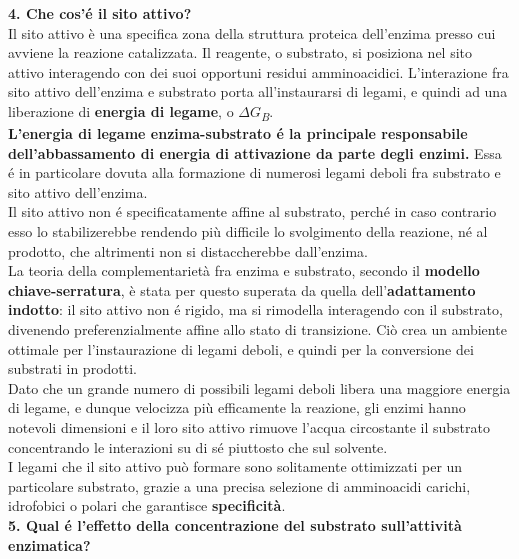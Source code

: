 \documentclass[a4paper,12pt]{article}
\begin{document}
\textbf{4. Che cos'\'e il sito attivo?}\\

Il sito attivo \`e una specifica zona della struttura proteica dell'enzima presso cui avviene la reazione catalizzata. Il reagente, o substrato, si posiziona nel sito attivo interagendo con dei suoi opportuni residui amminoacidici.
L'interazione fra sito attivo dell'enzima e substrato porta all'instaurarsi di legami, e quindi ad una liberazione di \textbf{energia di legame}, o \textit{$\Delta G$\textsubscript{B}}.\\
\textbf{L'energia di legame enzima-substrato \'e la principale responsabile dell'abbassamento di energia di attivazione da parte degli enzimi.}
Essa \'e in particolare dovuta alla formazione di numerosi legami deboli fra substrato e sito attivo dell'enzima.\\
Il sito attivo non \'e specificatamente affine al substrato, perch\'e in caso contrario esso lo stabilizerebbe rendendo pi\`u difficile lo svolgimento della reazione, n\'e al prodotto, che altrimenti non si distaccherebbe dall'enzima.\\ La teoria della complementariet\`a fra enzima e substrato, secondo il \textbf{modello chiave-serratura}, è stata per questo superata da quella dell'\textbf{adattamento indotto}: il sito attivo non \'e rigido, ma si rimodella interagendo con il substrato, divenendo preferenzialmente affine allo stato di transizione. Ci\`o crea un ambiente ottimale per l'instaurazione di legami deboli, e quindi per la conversione dei substrati in prodotti.\\
Dato che un grande numero di possibili legami deboli libera una maggiore energia di legame, e dunque velocizza pi\`u efficamente la reazione, gli enzimi hanno notevoli dimensioni e il loro sito attivo rimuove l'acqua circostante il substrato concentrando le interazioni su di s\'e piuttosto che sul solvente.\\
I legami che il sito attivo pu\`o formare sono solitamente ottimizzati per un particolare substrato, grazie a una precisa selezione di amminoacidi carichi, idrofobici o polari che garantisce \textbf{specificit\`a}.\\

\textbf{5. Qual \'e l'effetto della concentrazione del substrato sull'attivit\`a enzimatica?}\\
\end{document}

